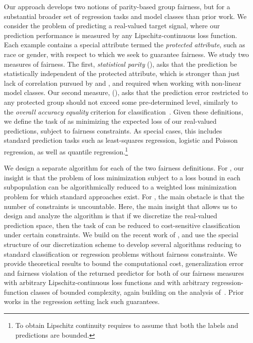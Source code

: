 \documentclass{article}
\begin{document}
Our approach develops two notions of parity-based group fairness, but for a substantial broader set of regression tasks and model classes
than prior work. We consider the problem of predicting a real-valued target signal, where our prediction performance is measured by any Lipschitz-continuous loss function. Each example contains a special attribute termed the \emph{protected attribute}, such as race or gender, with respect to which we seek to guarantee fairness.
We study two measures of fairness. The first, \emph{statistical parity} (\sp), asks that the prediction be statistically independent of the protected attribute, which is stronger than just lack of correlation pursued by \citet{CaldersEtAl13} and \citet{johnson2016impartial}, and required when working with non-linear model classes.
Our second measure, \emph{\ep} (\epshort), asks that the prediction error restricted to any protected group should not exceed some pre-determined level, similarly to the \emph{overall accuracy equality} criterion for classification~\cite{dieterich2016compas}.
Given these definitions, we define the task of \prob as minimizing the expected loss of our real-valued predictions, subject to fairness constraints. As special cases, this includes standard prediction tasks such as least-squares regression, logistic and Poisson regression, as well as quantile regression.\footnote{To obtain Lipschitz continuity requires to assume that both the labels and predictions are bounded.}
\fi

We design a separate algorithm for each of the two fairness definitions.
For \epshort, our insight is that the problem of loss minimization subject to a loss bound in each subpopulation can be algorithmically reduced to a weighted loss minimization problem for which standard approaches exist. For \sp, the main obstacle is that the number of constraints is uncountable. Here, the main insight that allows us to design and analyze the algorithm is that if we discretize the real-valued prediction space, then the task of \prob can be reduced to cost-sensitive classification under certain constraints. We build on the recent work of \citet{agarwal2018reductions}, and use the special structure of our discretization scheme to develop several algorithms reducing to standard classification or regression problems without fairness constraints. We provide theoretical results to bound the computational cost, generalization error and fairness violation of the returned predictor for both of our fairness measures with arbitrary Lipschitz-continuous loss functions and with arbitrary regression-function classes of bounded complexity, again building on the analysis of~\citet{agarwal2018reductions}. Prior works in the regression setting lack such guarantees.
\end{document}
